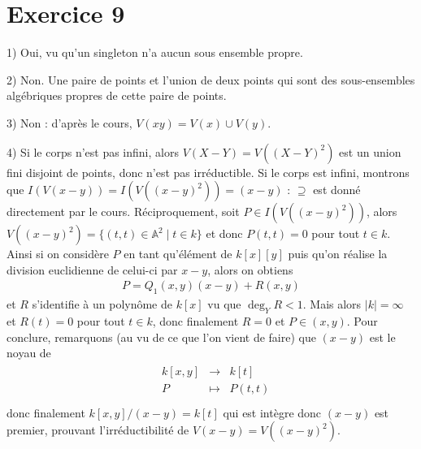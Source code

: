     \section{Exercice 9}
        \begin{question}{1)}
            Oui, vu qu'un singleton n'a aucun sous ensemble propre.
        \end{question}
        \begin{question}{2)}
            Non. Une paire de points et l'union de deux points qui sont des sous-ensembles algébriques propres de cette paire de points.
        \end{question}
        \begin{question}{3)}
            Non : d'après le cours, $V(xy) = V(x) \cup V(y)$.
        \end{question}
        \begin{question}{4)}
            Si le corps n'est pas infini, alors $V(X-Y) = V((X-Y)^2)$ est un union fini disjoint de points, donc n'est pas irréductible. Si le corps est infini, montrons que $I(V(x-y)) = I(V((x-y)^2)) = (x - y)$ : $\supseteq$ est donné directement par le cours. Réciproquement, soit $P \in I(V((x-y)^2))$, alors $V((x-y)^2) = \{(t,t) \in \mathbb{A}^2 \mid t \in k\}$ et donc $P(t,t) = 0$ pour tout $t \in k$. Ainsi si on considère $P$ en tant qu'élément de $k[x][y]$ puis qu'on réalise la division euclidienne de celui-ci par $x-y$, alors on obtiens
            \begin{align*}
                P = Q_1(x,y)(x-y) + R(x,y)
            \end{align*}
            et $R$ s'identifie à un polynôme de $k[x]$ vu que $\deg_Y R < 1$. Mais alors $|k| = \infty$ et $R(t) = 0$ pour tout $t \in k$, donc finalement $R = 0$ et $P \in (x,y)$. Pour conclure, remarquons (au vu de ce que l'on vient de faire) que $(x-y)$ est le noyau de
            \begin{align*}
                \begin{array}{cccc}
                    & k[x,y] & \to & k[t] \\
                    & P & \mapsto & P(t,t) \\
                \end{array}
            \end{align*}
            donc finalement $k[x,y]/(x-y) = k[t]$ qui est intègre donc $(x-y)$ est premier, prouvant l'irréductibilité de $V(x-y) = V((x - y)^2)$.
        \end{question}
